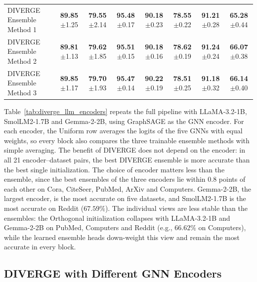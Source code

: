 \documentclass[a4paper,fleqn]{cas-sc}
\DeclareRobustCommand{\revcommon}[2][]{\textcolor{revshared}{#2}} %
\begin{document}
\begin{table}[htbp]
\begin{tabular*}{\textwidth}{@{\extracolsep{\fill}} lccccccc @{}}
DIVERGE Ensemble Method 1 & \textbf{89.85}{\scriptsize$\pm$1.25} & \textbf{79.55}{\scriptsize$\pm$2.14} & \textbf{95.48}{\scriptsize$\pm$0.17} & \textbf{90.18}{\scriptsize$\pm$0.23} & \textbf{78.55}{\scriptsize$\pm$0.22} & \textbf{91.21}{\scriptsize$\pm$0.28} & \textbf{65.28}{\scriptsize$\pm$0.44} \\
DIVERGE Ensemble Method 2 & \textbf{89.81}{\scriptsize$\pm$1.13} & \textbf{79.62}{\scriptsize$\pm$1.85} & \textbf{95.51}{\scriptsize$\pm$0.15} & \textbf{90.18}{\scriptsize$\pm$0.16} & \textbf{78.62}{\scriptsize$\pm$0.19} & \textbf{91.24}{\scriptsize$\pm$0.24} & \textbf{66.07}{\scriptsize$\pm$0.38} \\
DIVERGE Ensemble Method 3 & \textbf{89.85}{\scriptsize$\pm$1.17} & \textbf{79.70}{\scriptsize$\pm$1.93} & \textbf{95.47}{\scriptsize$\pm$0.14} & \textbf{90.22}{\scriptsize$\pm$0.19} & \textbf{78.51}{\scriptsize$\pm$0.25} & \textbf{91.18}{\scriptsize$\pm$0.32} & \textbf{66.14}{\scriptsize$\pm$0.40} \\
\bottomrule
\end{tabular*}
\end{table}

\revcommon[R1,R2]{Table~\ref{tab:diverge_llm_encoders} repeats the full pipeline with LLaMA-3.2-1B, SmolLM2-1.7B and Gemma-2-2B, using GraphSAGE as the GNN encoder. For each encoder, the Uniform row averages the logits of the five GNNs with equal weights, so every block also compares the three trainable ensemble methods with simple averaging. The benefit of DIVERGE does not depend on the encoder: in all 21 encoder--dataset pairs, the best DIVERGE ensemble is more accurate than the best single initialization. The choice of encoder matters less than the ensemble, since the best ensembles of the three encoders lie within 0.8 points of each other on Cora, CiteSeer, PubMed, ArXiv and Computers. Gemma-2-2B, the largest encoder, is the most accurate on five datasets, and SmolLM2-1.7B is the most accurate on Reddit ($67.59\%$). The individual views are less stable than the ensembles: the Orthogonal initialization collapses with LLaMA-3.2-1B and Gemma-2-2B on PubMed, Computers and Reddit (e.g., $66.62\%$ on Computers), while the learned ensemble heads down-weight this view and remain the most accurate in every block.}


\subsection{DIVERGE with Different GNN Encoders}\label{sec:gnn_encoders}
\end{document}
